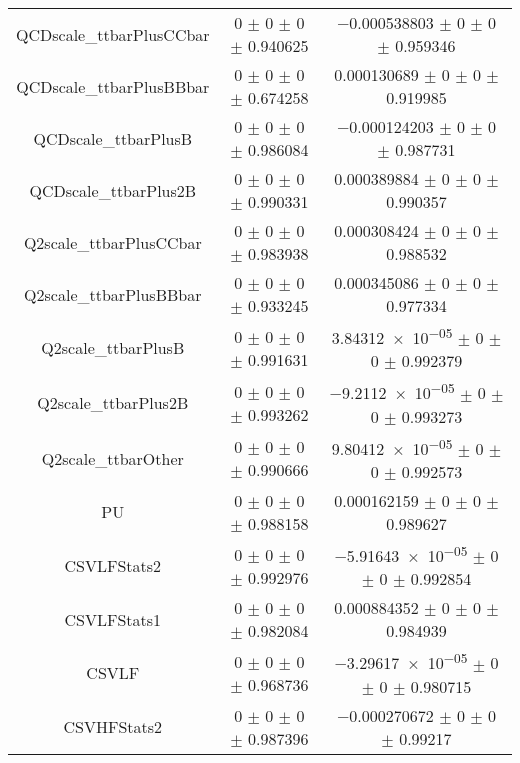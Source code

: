 \begin{table}
\begin{tabular}{ccc}
QCDscale\_ttbarPlusCCbar 	& \num{0} $\pm$ \num{0} $\pm$ \num{0} $\pm$ \num{0.940625} 	& \num{-0.000538803} $\pm$ \num{0} $\pm$ \num{0} $\pm$ \num{0.959346}\\
QCDscale\_ttbarPlusBBbar 	& \num{0} $\pm$ \num{0} $\pm$ \num{0} $\pm$ \num{0.674258} 	& \num{0.000130689} $\pm$ \num{0} $\pm$ \num{0} $\pm$ \num{0.919985}\\
QCDscale\_ttbarPlusB 	& \num{0} $\pm$ \num{0} $\pm$ \num{0} $\pm$ \num{0.986084} 	& \num{-0.000124203} $\pm$ \num{0} $\pm$ \num{0} $\pm$ \num{0.987731}\\
QCDscale\_ttbarPlus2B 	& \num{0} $\pm$ \num{0} $\pm$ \num{0} $\pm$ \num{0.990331} 	& \num{0.000389884} $\pm$ \num{0} $\pm$ \num{0} $\pm$ \num{0.990357}\\
Q2scale\_ttbarPlusCCbar 	& \num{0} $\pm$ \num{0} $\pm$ \num{0} $\pm$ \num{0.983938} 	& \num{0.000308424} $\pm$ \num{0} $\pm$ \num{0} $\pm$ \num{0.988532}\\
Q2scale\_ttbarPlusBBbar 	& \num{0} $\pm$ \num{0} $\pm$ \num{0} $\pm$ \num{0.933245} 	& \num{0.000345086} $\pm$ \num{0} $\pm$ \num{0} $\pm$ \num{0.977334}\\
Q2scale\_ttbarPlusB 	& \num{0} $\pm$ \num{0} $\pm$ \num{0} $\pm$ \num{0.991631} 	& \num{3.84312e-05} $\pm$ \num{0} $\pm$ \num{0} $\pm$ \num{0.992379}\\
Q2scale\_ttbarPlus2B 	& \num{0} $\pm$ \num{0} $\pm$ \num{0} $\pm$ \num{0.993262} 	& \num{-9.2112e-05} $\pm$ \num{0} $\pm$ \num{0} $\pm$ \num{0.993273}\\
Q2scale\_ttbarOther 	& \num{0} $\pm$ \num{0} $\pm$ \num{0} $\pm$ \num{0.990666} 	& \num{9.80412e-05} $\pm$ \num{0} $\pm$ \num{0} $\pm$ \num{0.992573}\\
PU 	& \num{0} $\pm$ \num{0} $\pm$ \num{0} $\pm$ \num{0.988158} 	& \num{0.000162159} $\pm$ \num{0} $\pm$ \num{0} $\pm$ \num{0.989627}\\
CSVLFStats2 	& \num{0} $\pm$ \num{0} $\pm$ \num{0} $\pm$ \num{0.992976} 	& \num{-5.91643e-05} $\pm$ \num{0} $\pm$ \num{0} $\pm$ \num{0.992854}\\
CSVLFStats1 	& \num{0} $\pm$ \num{0} $\pm$ \num{0} $\pm$ \num{0.982084} 	& \num{0.000884352} $\pm$ \num{0} $\pm$ \num{0} $\pm$ \num{0.984939}\\
CSVLF 	& \num{0} $\pm$ \num{0} $\pm$ \num{0} $\pm$ \num{0.968736} 	& \num{-3.29617e-05} $\pm$ \num{0} $\pm$ \num{0} $\pm$ \num{0.980715}\\
CSVHFStats2 	& \num{0} $\pm$ \num{0} $\pm$ \num{0} $\pm$ \num{0.987396} 	& \num{-0.000270672} $\pm$ \num{0} $\pm$ \num{0} $\pm$ \num{0.99217}\\

\end{tabular}
\end{table}
